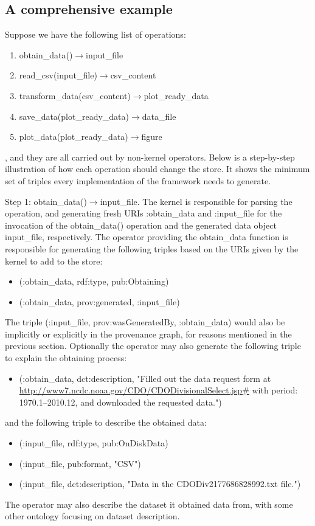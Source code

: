 \subsection{A comprehensive example}
\label{sec:example}
Suppose we have the following list of operations:
\begin{enumerate}
	\item obtain\_data()$\rightarrow$input\_file
	\item read\_csv(input\_file)$\rightarrow$csv\_content
	\item transform\_data(csv\_content)$\rightarrow$plot\_ready\_data
	\item save\_data(plot\_ready\_data)$\rightarrow$data\_file
	\item plot\_data(plot\_ready\_data)$\rightarrow$figure
\end{enumerate}
, and they are all carried out by non-kernel operators. Below is a step-by-step illustration of how each operation should change the store. It shows the minimum set of triples every implementation of the framework needs to generate.

Step 1: obtain\_data()$\rightarrow$input\_file. The kernel is responsible for parsing the operation, and generating fresh URIs :obtain\_data and :input\_file for the invocation of the obtain\_data() operation and the generated data object input\_file, respectively. The operator providing the obtain\_data function is responsible for generating the following triples based on the URIs given by the kernel to add to the store:
\begin{itemize}
	\item (:obtain\_data, rdf:type, pub:Obtaining)
	\item (:obtain\_data, prov:generated, :input\_file)
\end{itemize}
The triple (:input\_file, prov:wasGeneratedBy, :obtain\_data) would also be implicitly or explicitly in the provenance graph, for reasons mentioned in the previous section.
Optionally the operator may also generate the following triple to explain the obtaining process:
\begin{itemize}
	\item (:obtain\_data, dct:description, "Filled out the data request form at \url{http://www7.ncdc.noaa.gov/CDO/CDODivisionalSelect.jsp#} with period: 1970.1--2010.12, and downloaded the requested data.")
\end{itemize}
and the following triple to describe the obtained data:
\begin{itemize}
	\item (:input\_file, rdf:type, pub:OnDiskData)
	\item (:input\_file, pub:format, "CSV")
	\item (:input\_file, dct:description, "Data in the CDODiv2177686828992.txt file.")
\end{itemize}
The operator may also describe the dataset it obtained data from, with some other ontology focusing on dataset description.

